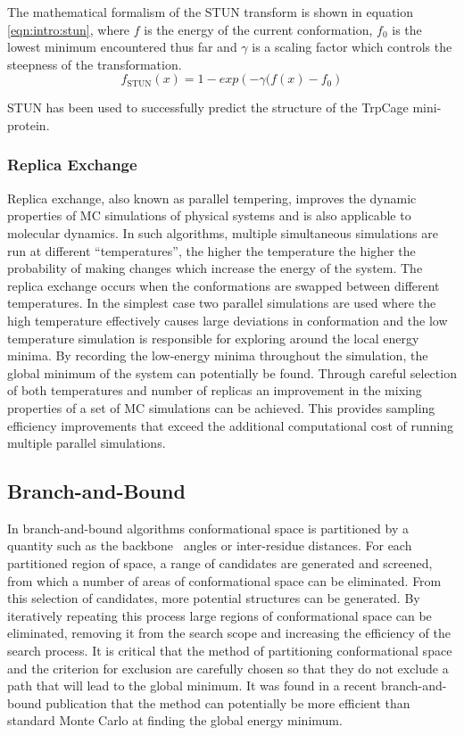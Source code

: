  
The mathematical formalism of the STUN transform is shown in equation \ref{eqn:intro:stun},
where $f$ is the energy of the current conformation, $f_0$ is the lowest minimum encountered thus far and $\gamma$ is a
scaling factor which controls the steepness of the
transformation. 
\begin{equation}
f_\mathrm{STUN}(x) = 1-exp \left(  -\gamma(f( x) -f_{0} \right)
\label{eqn:intro:stun}
\end{equation}

STUN has been used to successfully predict
the structure of the TrpCage mini-protein\cite{SIMULATION:STUN:trpcage}.


\subsubsection{Replica Exchange}

Replica exchange, also known as parallel tempering, improves the dynamic properties of MC simulations of physical systems and is also
applicable to molecular dynamics\cite{SIMULATION:REMD}. In such
algorithms, multiple simultaneous simulations are run at different ``temperatures'',
the higher the temperature the higher the probability of making changes which
increase the energy of the system. The replica exchange occurs when the conformations
are swapped between different temperatures. In the simplest case two parallel
simulations are used where the high temperature effectively causes large deviations in conformation and the low temperature simulation is responsible for exploring around the local energy minima. By recording the low-energy minima throughout the simulation, the global
minimum of the system can potentially be found. Through careful selection of both
temperatures and number of replicas an improvement in the mixing properties of a set of MC simulations can be achieved. This provides sampling efficiency
improvements that exceed the additional computational cost of running multiple parallel simulations.




\subsection{Branch-and-Bound}

In branch-and-bound algorithms conformational space is partitioned by a quantity
such as the backbone \phipsi\ angles or inter-residue distances. For each partitioned region of space, a range of candidates are generated and screened, from which a number of areas of conformational space can be eliminated. From this selection of candidates, more potential structures can be generated. By iteratively repeating this process large regions of conformational space can be eliminated,
removing it from the search scope and increasing the efficiency of the search
process. It is critical that the method of partitioning  conformational space and
the criterion for exclusion are carefully chosen so that they do not exclude a path that will lead to the
global minimum.
It was found in a recent branch-and-bound publication that the method can
potentially be more efficient than standard Monte Carlo at finding the global energy minimum\cite{SIMULATION:BranchAndBound}.

